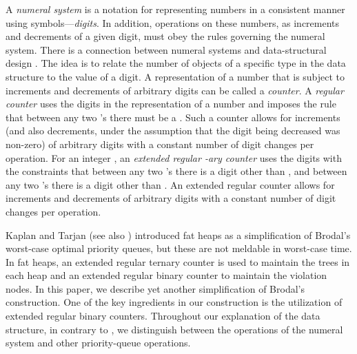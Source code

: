 \documentclass{llncs}
\begin{document}
A \emph{numeral system} is a notation for representing numbers 
in a consistent manner using symbols---\emph{digits}. 
In addition, operations on these numbers, as
increments and decrements of a given digit, must obey the rules
governing the numeral system.  There is a connection between numeral systems and
data-structural design \cite{CK77,Vui78}.  The idea is to relate the
number of objects of a specific type in the data structure to the
value of a digit.  
A representation of a number that is subject to increments and
decrements of arbitrary digits can be called a \emph{counter}. A
\emph{regular counter} \cite{CK77} uses the digits  in
the representation of a number and imposes the rule that between any
two 's there must be a . Such a counter allows for increments 
(and also decrements, under the assumption that the digit being decreased was
non-zero) of arbitrary digits with a constant number 
of digit changes per operation. For an integer , an 
\emph{extended regular -ary counter} uses the digits  
with the constraints that between any two 's there is a digit other 
than , and between any two 's there is a digit other than .  
An extended regular counter \cite{CK77,KST02} allows for increments and decrements 
of arbitrary digits with a constant number of digit changes per operation.

Kaplan and Tarjan \cite{KT99} (see also \cite{KST02}) introduced fat
heaps as a simplification of Brodal's worst-case optimal priority
queues, but these are not meldable in  worst-case time. In fat
heaps, an extended regular ternary counter is used to maintain the
trees in each heap and an extended regular binary counter to maintain
the violation nodes. In this paper, we describe yet another
simplification of Brodal's construction.  One of the key ingredients 
in our construction is the utilization of extended regular binary
counters.  Throughout our explanation of the data structure, in
contrary to \cite{Bro96}, we distinguish between the operations of
the numeral system and other priority-queue operations.
\end{document}
